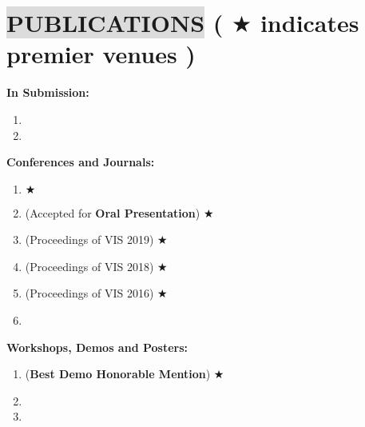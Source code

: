 \section*{
    \colorbox{gainsboro}{PUBLICATIONS}  {\small \normalfont ( \footnotesize $\bigstar$ \small indicates premier venues )}
}
\textbf{In Submission:}
\vspace{-3mm}
\begin{enumerate}[leftmargin=5mm]
    
    \item {}
    \item {}
\end{enumerate}

\textbf{Conferences and Journals:}
\vspace{-3mm}
\begin{enumerate}[leftmargin=5mm]
    \item {} \footnotesize $\bigstar$ \small
    \item {} (Accepted for \textbf{Oral Presentation}) \footnotesize $\bigstar$ \small
    \item {} (Proceedings of VIS 2019) \footnotesize $\bigstar$ \small
    \item {} (Proceedings of VIS 2018) \footnotesize $\bigstar$ \small
    \item {} (Proceedings of VIS 2016) \footnotesize $\bigstar$ \small
    \item {}
\end{enumerate}

\textbf{Workshops, Demos and Posters:}
\vspace{-3mm}
\begin{enumerate}[leftmargin=5mm]
    \item {}
    (\textbf{Best Demo Honorable Mention})
    \footnotesize $\bigstar$ \small
   \item {}
   \item {} 
\end{enumerate}
